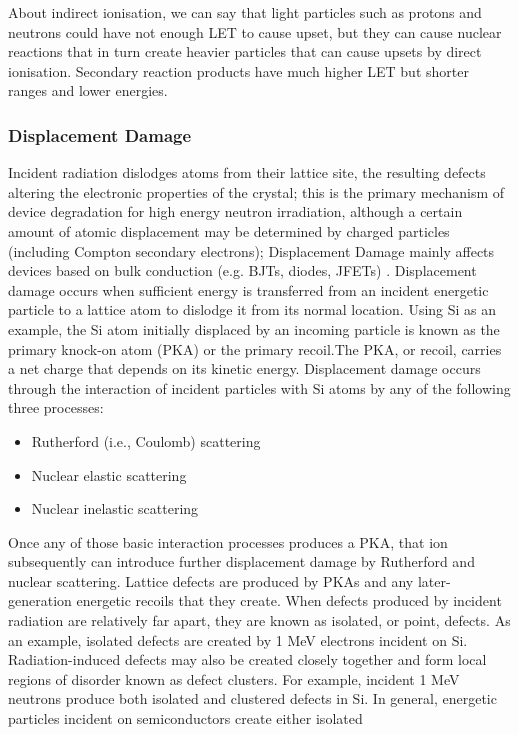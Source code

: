\documentclass[./dissertation.tex]{subfiles}
\begin{document}
About indirect ionisation, we can say that light particles such as protons and neutrons
could have not enough LET to cause upset, but they can cause nuclear reactions that
in turn create heavier particles that can cause upsets by direct ionisation. Secondary
reaction products have much higher LET but shorter ranges and lower energies\cite{bib9}.
\subsubsection{Displacement Damage}
Incident radiation dislodges atoms from their lattice site, the resulting defects altering the electronic properties of the crystal; this is the primary mechanism of device
degradation for high energy neutron irradiation, although a certain amount of atomic
displacement may be determined by charged particles (including Compton secondary
electrons); Displacement Damage mainly affects devices based on bulk conduction
(e.g. BJTs, diodes, JFETs) \cite{bib1}. Displacement damage occurs when sufficient energy
is transferred from an incident energetic particle to a lattice atom to dislodge it from
its normal location. Using Si as an example, the Si atom initially displaced by an
incoming particle is known as the primary knock-on atom (PKA) or the primary recoil.The PKA, or recoil, carries a net charge that depends on its kinetic energy.
Displacement damage occurs through the interaction of incident particles with Si
atoms by any of the following three processes:
\begin{itemize}
\item Rutherford (i.e., Coulomb) scattering
\item Nuclear elastic scattering
\item Nuclear inelastic scattering
\end{itemize}
Once any of those basic interaction processes produces a PKA, that ion subsequently
can introduce further displacement damage by Rutherford and nuclear scattering.
Lattice defects are produced by PKAs and any later-generation energetic recoils that
they create. When defects produced by incident radiation are relatively far apart,
they are known as isolated, or point, defects. As an example, isolated defects are
created by 1 MeV electrons incident on Si. Radiation-induced defects may also be
created closely together and form local regions of disorder known as defect clusters.
For example, incident 1 MeV neutrons produce both isolated and clustered defects in
Si. In general, energetic particles incident on semiconductors create either isolated
\end{document}
